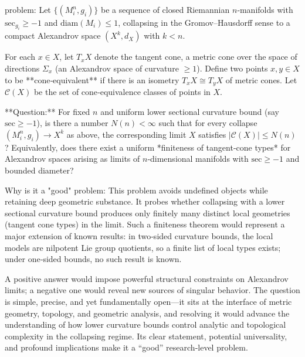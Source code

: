 problem:  
Let $\{(M_i^n,g_i)\}$ be a sequence of closed Riemannian $n$‑manifolds with $\mathrm{sec}_{g_i}\ge -1$ and $\mathrm{diam}(M_i)\le 1$, collapsing in the Gromov–Hausdorff sense to a compact Alexandrov space $(X^k,d_X)$ with $k<n$.  

For each $x\in X$, let $T_xX$ denote the tangent cone, a metric cone over the space of directions $\Sigma_x$ (an Alexandrov space of curvature $\ge1$).  Define two points $x,y\in X$ to be **cone‑equivalent** if there is an isometry $T_xX\cong T_yX$ of metric cones.  Let $\mathcal{C}(X)$ be the set of cone‑equivalence classes of points in $X$.  

**Question:**  
For fixed $n$ and uniform lower sectional curvature bound (say $\mathrm{sec}\ge -1$), is there a number $N(n)<\infty$ such that for every collapse $(M_i^n,g_i)\to X^k$ as above, the corresponding limit $X$ satisfies $|\mathcal{C}(X)|\le N(n)$?  
Equivalently, does there exist a uniform *finiteness of tangent‑cone types* for Alexandrov spaces arising as limits of $n$‑dimensional manifolds with $\mathrm{sec}\ge -1$ and bounded diameter?

Why is it a "good" problem:  
This problem avoids undefined objects while retaining deep geometric substance.  It probes whether collapsing with a lower sectional curvature bound produces only finitely many distinct local geometries (tangent cone types) in the limit.  Such a finiteness theorem would represent a major extension of known results: in two‑sided curvature bounds, the local models are nilpotent Lie group quotients, so a finite list of local types exists; under one‑sided bounds, no such result is known.  

A positive answer would impose powerful structural constraints on Alexandrov limits; a negative one would reveal new sources of singular behavior.  The question is simple, precise, and yet fundamentally open—it sits at the interface of metric geometry, topology, and geometric analysis, and resolving it would advance the understanding of how lower curvature bounds control analytic and topological complexity in the collapsing regime.  Its clear statement, potential universality, and profound implications make it a “good” research‑level problem.
